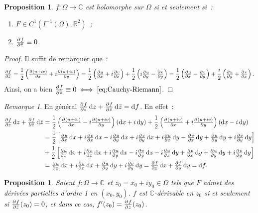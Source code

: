 \documentclass{report}
\newtheorem{prp}[thm]{Proposition}
\theoremstyle{definition}
\theoremstyle{remark}
\newtheorem*{rmq}{Remarque}
\numberwithin{equation}{section}
\newcommand{\C}{\mathbb C}
\newcommand{\R}{\mathbb R}
\begin{document}
			\begin{prp} $f : \Omega \to \C$ est holomorphe sur $\Omega$ si et seulement si~:
			\begin{enumerate}
				\item $F \in C^1\left(I^{-1}(\Omega), \R^2\right)$~;
				\item $\pd f{\bar z} \equiv 0$.
			\end{enumerate}
			\end{prp}

			\begin{proof}
			Il suffit de remarquer que~:
			\begin{equation}
				\pd f{\bar z} = \frac 12\left(\pd {(u+iv)}x + i\pd {(u+iv)}y\right) = \frac 12\left(\pd ux +i\pd vx\right) + \frac 12\left(i\pd uy - \pd vy\right)
					= \frac 12\left(\pd ux - \pd vy\right) + \frac i2\left(\pd uy + \pd vx\right).
			\end{equation}
			Ainsi, on a bien $\pd f{\overline z} \equiv 0 \iff \eqref{eq:Cauchy-Riemann}$.
			\end{proof}

			\begin{rmq} En général $\pd fz\dif z + \pd f{\bar z}\dif \bar z = \dif f$.  %
			En effet~:
			\begin{align}\displaystyle
				\pd fz\dif z + \pd f{\bar z}\dif \bar z &= \frac 12\left(\pd {(u+iv)}x - i\pd {(u+iv)}y\right)\left(\dif x + i\dif y\right) + \frac 12\left(\pd {(u+iv)}x + i\pd {(u+iv)}y\right)\left(\dif x - i\dif y\right) \\
				&= \frac 12\left[\pd ux\dif x + i\pd vx\dif x - i\pd uy\dif x + i\pd vy\dif x + i\pd ux\dif y - \pd vx\dif y + \pd uy\dif y + i\pd vy\dif y\right] \\
				&+ \frac 12\left[\pd ux\dif x + i\pd vx\dif x + i\pd uy\dif x - i\pd vy\dif x - i\pd ux\dif y + \pd vx\dif y + \pd uy\dif y + i\pd vy\dif y\right] \\
				&= \pd ux\dif x + i\pd vx\dif x + \pd uy\dif y + i\pd vy\dif y = \pd fx\dif x + \pd fy\dif y = \dif f.
			\end{align}
			\end{rmq}

			\begin{prp} Soient $f : \Omega \to \C$ et $z_0 = x_0 + iy_0 \in \Omega$ tels que $F$ admet des dérivées partielles d'ordre 1 en $(x_0, y_0)$. $f$
			est $\C$-dérivable en $z_0$ si et seulement si $\pd f{\bar z}(z_0) = 0$, et dans ce cas, $f'(z_0) = \pd fz(z_0)$.
			\end{prp}
\end{document}
